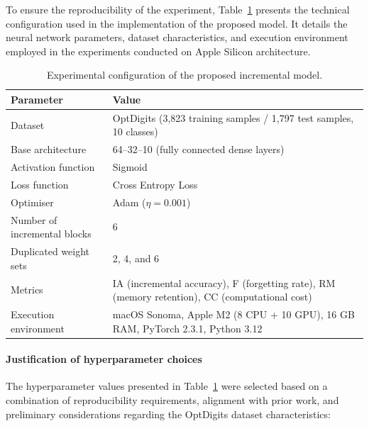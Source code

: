 To ensure the reproducibility of the experiment, Table~\ref{tab:config} presents the technical configuration used in the implementation of the proposed model.  
It details the neural network parameters, dataset characteristics, and execution environment employed in the experiments conducted on Apple Silicon architecture.

\begin{table}[H]
\centering
\caption{Experimental configuration of the proposed incremental model.}
\label{tab:config}
\begin{tabularx}{\textwidth}{l X}
\toprule
\textbf{Parameter} & \textbf{Value} \\
\midrule
Dataset & OptDigits (3,823 training samples / 1,797 test samples, 10 classes) \\
Base architecture & 64--32--10 (fully connected dense layers) \\
Activation function & Sigmoid \\
Loss function & Cross Entropy Loss \\
Optimiser & Adam (\(\eta = 0.001\)) \\
Number of incremental blocks & 6 \\
Duplicated weight sets & 2, 4, and 6 \\
Metrics & IA (incremental accuracy), F (forgetting rate), RM (memory retention), 
CC (computational cost) \\
Execution environment & macOS Sonoma, Apple M2 (8 CPU + 10 GPU), 16 GB RAM, 
PyTorch 2.3.1, Python 3.12 \\
\bottomrule
\end{tabularx}
\end{table}

\paragraph{Justification of hyperparameter choices}
The hyperparameter values presented in Table~\ref{tab:config} were selected based on 
a combination of reproducibility requirements, alignment with prior work, and 
preliminary considerations regarding the OptDigits dataset characteristics:

